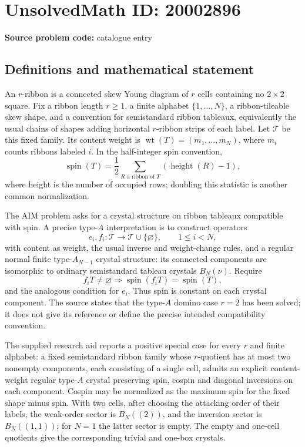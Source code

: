 \documentclass[11pt]{article}
\begin{document}
\section*{UnsolvedMath ID: 20002896}
\textbf{Source problem code:} catalogue entry
\subsection{Definitions and mathematical statement}
An \(r\)-ribbon is a connected skew Young diagram of \(r\) cells containing no \(2\times2\) square. Fix a ribbon length \(r\ge1\), a finite alphabet \(\{1,\ldots,N\}\), a ribbon-tileable skew shape, and a convention for semistandard ribbon tableaux, equivalently the usual chains of shapes adding horizontal \(r\)-ribbon strips of each label. Let \(\mathcal T\) be this fixed family. Its content weight is \(\operatorname{wt}(T)=(m_1,\ldots,m_N)\), where \(m_i\) counts ribbons labeled \(i\). In the half-integer spin convention,
\[
\operatorname{spin}(T)=\frac12\sum_{R\text{ a ribbon of }T}(\operatorname{height}(R)-1),
\]
where height is the number of occupied rows; doubling this statistic is another common normalization.

The AIM problem asks for a crystal structure on ribbon tableaux compatible with spin. A precise type-\(A\) interpretation is to construct operators
\[
e_i,f_i:\mathcal T\longrightarrow\mathcal T\cup\{\varnothing\},\qquad 1\le i<N,
\]
with content as weight, the usual inverse and weight-change rules, and a regular normal finite type-\(A_{N-1}\) crystal structure: its connected components are isomorphic to ordinary semistandard tableau crystals \(B_N(\nu)\). Require
\[
f_iT\ne\varnothing\Longrightarrow\operatorname{spin}(f_iT)=\operatorname{spin}(T),
\]
and the analogous condition for \(e_i\). Thus spin is constant on each crystal component. The source states that the type-\(A\) domino case \(r=2\) has been solved; it does not give its reference or define the precise intended compatibility convention.

The supplied research aid reports a positive special case for every \(r\) and finite alphabet: a fixed semistandard ribbon family whose \(r\)-quotient has at most two nonempty components, each consisting of a single cell, admits an explicit content-weight regular type-\(A\) crystal preserving spin, cospin and diagonal inversions on each component. Cospin may be normalized as the maximum spin for the fixed shape minus spin. With two cells, after choosing the attacking order of their labels, the weak-order sector is \(B_N((2))\), and the inversion sector is \(B_N((1,1))\); for \(N=1\) the latter sector is empty. The empty and one-cell quotients give the corresponding trivial and one-box crystals.
\end{document}
